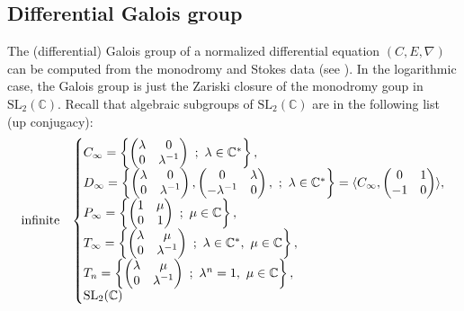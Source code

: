\documentclass[12]{amsart}
\newcommand{\SL}{\mathrm{SL}_2}
\begin{document}
\subsection{Differential Galois group}

The (differential) Galois group of a normalized differential equation $(C,E,\nabla)$ can be computed 
from the monodromy and Stokes data (see \cite{MRGalois}). In the logarithmic case, 
the Galois group is just the Zariski closure of the monodromy goup in $\SL(\mathbb C)$.
Recall that algebraic subgroups of $\SL(\mathbb C)$ are in the following list (up conjugacy):
\begin{equation}\label{eq:listGaloisGroup}
\begin{matrix}
\text{infinite} & 
\left\{\begin{matrix} C_\infty=\left\{\begin{pmatrix}\lambda&0\\ 0&\lambda^{-1}\end{pmatrix}\ ;\ \lambda\in\mathbb C^*\right\},\hfill\hfill\\
D_\infty=\left\{\begin{pmatrix}\lambda&0\\ 0&\lambda^{-1}\end{pmatrix},\begin{pmatrix}0&\lambda\\ -\lambda^{-1}&0\end{pmatrix},\ ;\ \lambda\in\mathbb C^*\right\}=\langle C_\infty,\begin{pmatrix}0&1\\-1&0\end{pmatrix}\rangle,\\
P_\infty=\left\{\begin{pmatrix}1&\mu\\ 0&1\end{pmatrix}\ ;\ \mu\in\mathbb C\right\},\hfill\hfill\\
T_\infty=\left\{\begin{pmatrix}\lambda&\mu\\ 0&\lambda^{-1}\end{pmatrix}\ ;\ \lambda\in\mathbb C^*,\ \mu\in\mathbb C\right\},\hfill\hfill\\
T_n=\left\{\begin{pmatrix}\lambda&\mu\\ 0&\lambda^{-1}\end{pmatrix}\ ;\ \lambda^n=1,\ \mu\in\mathbb C\right\},\hfill\hfill\\
\SL(\mathbb C)\hfill\hfill\end{matrix}\right.  \\

\end{matrix}
\end{equation}
\end{document}
